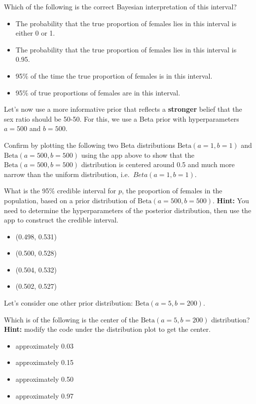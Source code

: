 \documentclass[
]{article}
\providecommand{\tightlist}{%
  \setlength{\itemsep}{0pt}\setlength{\parskip}{0pt}}
\begin{document}
Which of the following is the correct Bayesian interpretation of this
interval?

\begin{itemize}
\tightlist
\item
  The probability that the true proportion of females lies in this
  interval is either 0 or 1.
\item
  The probability that the true proportion of females lies in this
  interval is 0.95.
\item
  95\% of the time the true proportion of females is in this interval.
\item
  95\% of true proportions of females are in this interval.
\end{itemize}

Let's now use a more informative prior that reflects a \textbf{stronger}
belief that the sex ratio should be 50-50. For this, we use a Beta prior
with hyperparameters \(a = 500\) and \(b = 500\).

Confirm by plotting the following two Beta distributions
\(\text{Beta}(a = 1, b = 1)\) and \(\text{Beta}(a = 500, b = 500)\)
using the app above to show that the \(\text{Beta}(a = 500, b = 500)\)
distribution is centered around 0.5 and much more narrow than the
uniform distribution, i.e.~\(Beta(a = 1, b = 1)\).

What is the 95\% credible interval for \(p\), the proportion of females
in the population, based on a prior distribution of
\(\text{Beta}(a = 500, b = 500)\). \textbf{Hint:} You need to determine
the hyperparameters of the posterior distribution, then use the app to
construct the credible interval.

\begin{itemize}
\tightlist
\item
  (0.498, 0.531)
\item
  (0.500, 0.528)
\item
  (0.504, 0.532)
\item
  (0.502, 0.527)
\end{itemize}

Let's consider one other prior distribution:
\(\text{Beta}(a = 5, b = 200)\).

Which is of the following is the center of the
\(\text{Beta}(a = 5, b = 200)\) distribution? \textbf{Hint:} modify the
code under the distribution plot to get the center.

\begin{itemize}
\tightlist
\item
  approximately 0.03
\item
  approximately 0.15
\item
  approximately 0.50
\item
  approximately 0.97
\end{itemize}
\end{document}
